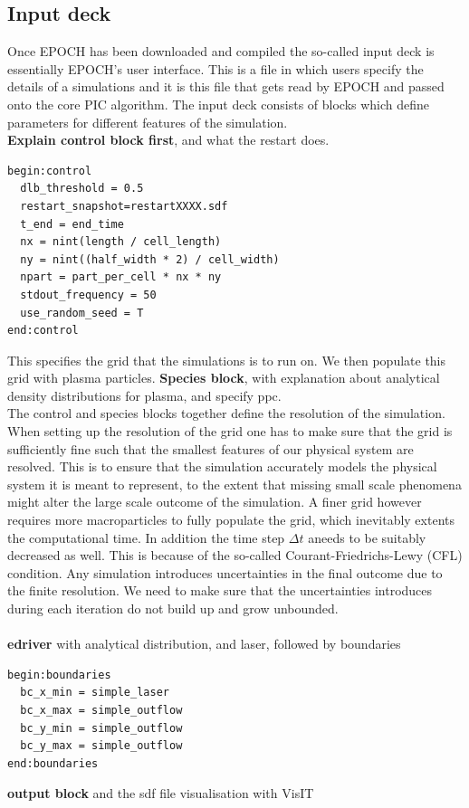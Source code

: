 \begin{itemize}
\subsection{Input deck}
Once EPOCH has been downloaded and compiled the so-called input deck is essentially EPOCH's user interface. This is a file in which users specify the details of a simulations and it is this file that gets read by EPOCH and passed onto the core PIC algorithm. The input deck consists of blocks which define parameters for different features of the simulation. \\
\textbf{Explain control block first}, and what the restart does.
\begin{verbatim}
begin:control
  dlb_threshold = 0.5
  restart_snapshot=restartXXXX.sdf
  t_end = end_time
  nx = nint(length / cell_length)
  ny = nint((half_width * 2) / cell_width)
  npart = part_per_cell * nx * ny
  stdout_frequency = 50
  use_random_seed = T
end:control
\end{verbatim}
This specifies the grid that the simulations is to run on. We then populate this grid with plasma particles.
\textbf{Species block}, with explanation about analytical density distributions for plasma, and specify ppc.\\
The control and species blocks together define the resolution of the simulation. When setting up the resolution of the grid one has to make sure that the grid is sufficiently fine such that the smallest features of our physical system are resolved. This is to ensure that the simulation accurately models the physical system it is meant to represent, to the extent that missing small scale phenomena might alter the large scale outcome of the simulation. A finer grid however requires more macroparticles to fully populate the grid, which inevitably extents the computational time. In addition the time step $\Delta t$ aneeds to be suitably decreased as well. This is because of the so-called Courant-Friedrichs-Lewy (CFL) condition.  Any simulation introduces uncertainties in the final outcome due to the finite resolution. We need to make sure that the uncertainties introduces during each iteration do not build up and grow unbounded. \\
\\
\textbf{edriver} with analytical distribution, and laser, followed by boundaries
\begin{center}
\begin{verbatim}
begin:boundaries
  bc_x_min = simple_laser
  bc_x_max = simple_outflow
  bc_y_min = simple_outflow
  bc_y_max = simple_outflow
end:boundaries
\end{verbatim}
\end{center}
\textbf{output block} and the sdf file visualisation with VisIT


\end{itemize}

